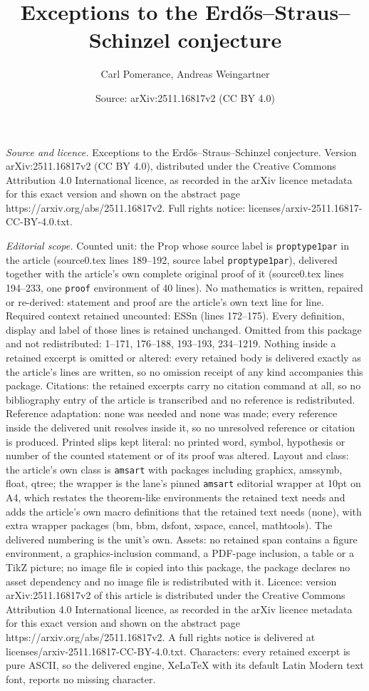 \documentclass[10pt,a4paper]{amsart}
\title[Exceptions to the Erd\H os--Straus--Schinzel conjecture]{Exceptions to the Erd\H os--Straus--Schinzel conjecture}
\author{Carl Pomerance, Andreas Weingartner}
\date{Source: arXiv:2511.16817v2 (CC BY 4.0)}
\begin{document}
\maketitle

\noindent\emph{Source and licence.} Exceptions to the Erd\H os--Straus--Schinzel conjecture. Version arXiv:2511.16817v2 (CC BY 4.0), distributed under the Creative Commons Attribution 4.0 International licence, as recorded in the arXiv licence metadata for this exact version and shown on the abstract page https://arxiv.org/abs/2511.16817v2. Full rights notice: licenses/arxiv-2511.16817-CC-BY-4.0.txt.\par\smallskip

\noindent\textit{Editorial scope.} Counted unit: the Prop whose source label is \texttt{proptype1par} in the article (source0.tex lines 189--192, source label \texttt{proptype1par}), delivered together with the article's own complete original proof of it (source0.tex lines 194--233, one \texttt{proof} environment of 40 lines). No mathematics is written, repaired or re-derived: statement and proof are the article's own text line for line. Required context retained uncounted: ESSn (lines 172--175). Every definition, display and label of those lines is retained unchanged. Omitted from this package and not redistributed: 1--171, 176--188, 193--193, 234--1219. Nothing inside a retained excerpt is omitted or altered: every retained body is delivered exactly as the article's lines are written, so no omission receipt of any kind accompanies this package. Citations: the retained excerpts carry no citation command at all, so no bibliography entry of the article is transcribed and no reference is redistributed. Reference adaptation: none was needed and none was made; every reference inside the delivered unit resolves inside it, so no unresolved reference or citation is produced. Printed slips kept literal: no printed word, symbol, hypothesis or number of the counted statement or of its proof was altered. Layout and class: the article's own class is \texttt{amsart} with packages including graphicx, amssymb, float, qtree; the wrapper is the lane's pinned \texttt{amsart} editorial wrapper at 10pt on A4, which restates the theorem-like environments the retained text needs and adds the article's own macro definitions that the retained text needs (none), with extra wrapper packages (bm, bbm, dsfont, xspace, cancel, mathtools). The delivered numbering is the unit's own. Assets: no retained span contains a figure environment, a graphics-inclusion command, a PDF-page inclusion, a table or a TikZ picture; no image file is copied into this package, the package declares no asset dependency and no image file is redistributed with it. Licence: version arXiv:2511.16817v2 of this article is distributed under the Creative Commons Attribution 4.0 International licence, as recorded in the arXiv licence metadata for this exact version and shown on the abstract page https://arxiv.org/abs/2511.16817v2. A full rights notice is delivered at licenses/arxiv-2511.16817-CC-BY-4.0.txt. Characters: every retained excerpt is pure ASCII, so the delivered engine, XeLaTeX with its default Latin Modern text font, reports no missing character.
\end{document}
